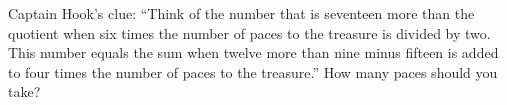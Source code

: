 Captain Hook's clue: ``Think of the number that is seventeen more than the quotient when six times the number of paces to the treasure is divided by two. This number equals the sum when twelve more than nine minus fifteen is added to four times the number of paces to the treasure.'' How many paces should you take?
